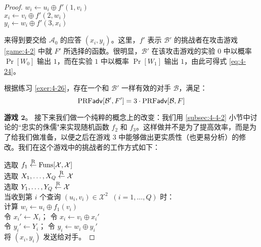 \begin{proof}
\hspace*{5pt} $w_i\leftarrow u_i\oplus f'(1,v_i)$\\
\hspace*{26pt} $x_i\leftarrow v_i\oplus f'(2,w_i)$\\
\hspace*{26pt} $y_i\leftarrow w_i\oplus f'(3,x_i)$

\vspace{5pt}

\noindent
来得到要交给 $\mathcal{A}_0$ 的应答 $(x_i,y_i)$。这里，$f'$ 表示 $\mathcal{B}'$ 的挑战者在攻击游戏 \ref{game:4-2} 中就 $F'$ 所选择的函数。很明显，$\mathcal{B}'$ 在该攻击游戏的实验 $0$ 中以概率 $\Pr[W_0]$ 输出 $1$，而在实验 $1$ 中以概率 $\Pr[W_1]$ 输出 $1$，由此可得式 \ref{eq:4-24}。

根据练习 \ref{exer:4-26}，存在一个和 $\mathcal{B}'$ 一样有效的对手 $\mathcal{B}$，满足：
\begin{equation}\label{eq:4-25}
{\rm PRF\mathsf{adv}}[\mathcal{B}', F']= 3\cdot {\rm PRF\mathsf{adv}}[\mathcal{B}, F]
\end{equation}

\noindent
\textbf{游戏 $\mathbf{2}$}。
接下来我们做一个纯粹的概念上的改变：我们用 \ref{subsec:4-4-2} 小节中讨论的``忠实的侏儒"来实现随机函数 $f_2$ 和 $f_3$。这样做并不是为了提高效率，而是为了给我们做准备，以便之后在游戏 $3$ 中能够做出更实质性（也更易分析）的修改。我们在这个游戏中的挑战者的工作方式如下：

\vspace{5pt}

\hspace*{5pt} 选取 $f_1\overset{\rm R}\leftarrow{\rm Funs}[\mathcal{X},\mathcal{X}]$\\
\hspace*{26pt} 选取 $X_1,\dots,X_Q\overset{\rm R}\leftarrow\mathcal{X}$\\
\hspace*{26pt} 选取 $Y_1,\dots,Y_Q\overset{\rm R}\leftarrow\mathcal{X}$\\
\hspace*{26pt} 当收到第 $i$ 个查询 $(u_i,v_i)\in\mathcal{X}^2\;\;(i=1,\dots,Q)$ 时：\\
\hspace*{50pt} 计算 $w_i\leftarrow u_i\oplus f_1(v_i)$\\
\hspace*{50pt} 令 $x_i'\leftarrow X_i$；
				令 $x_i\leftarrow v_i\oplus x_i'$\\
\hspace*{50pt} 令 $y_i'\leftarrow Y_i$；
				令 $y_i\leftarrow w_i\oplus y_i'$\\
\hspace*{50pt} 将 $(x_i,y_i)$ 发送给对手。


\end{proof}
